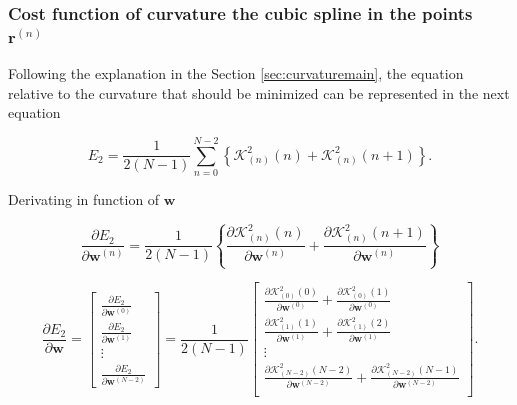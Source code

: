 \subsubsection{Cost function of curvature the cubic spline in the points $\mathbf{r}^{(n)}$}

Following the explanation in the Section \ref{sec:curvaturemain},
the equation relative to the curvature that should be minimized can be represented in the next equation




\begin{equation}
E_{2}
=
\frac{1}{2(N-1)}
\sum\limits_{n=0}^{N-2}
\left\{
\mathcal{K}_{(n)}^{2}(n)
+
\mathcal{K}_{(n)}^{2}(n+1)
\right\}.
\end{equation}

Derivating in function of $\mathbf{w}$

\begin{equation}
\frac{\partial E_{2}}{\partial \mathbf{w}^{(n)}}
=
\frac{1}{2(N-1)}
\left\{
\frac{
\partial 
\mathcal{K}_{(n)}^{2}(n)
}{\partial \mathbf{w}^{(n)}}
+
\frac{
\partial 
\mathcal{K}_{(n)}^{2}(n+1)
}{\partial \mathbf{w}^{(n)}}
\right\}
\end{equation}

\begin{equation}\label{eq:DE2}
\frac{\partial E_{2}}{\partial \mathbf{w}}
=
\begin{bmatrix}
\frac{\partial E_{2}}{\partial \mathbf{w}^{(0)}}\\[4pt]
\frac{\partial E_{2}}{\partial \mathbf{w}^{(1)}}\\[4pt]
\vdots\\[4pt]
\frac{\partial E_{2}}{\partial \mathbf{w}^{(N-2)}}
\end{bmatrix}
=
\frac{1}{2(N-1)}
\begin{bmatrix}
%
\frac{
\partial 
\mathcal{K}_{(0)}^{2}(0)
}{\partial \mathbf{w}^{(0)}}
+
\frac{
\partial 
\mathcal{K}_{(0)}^{2}(1)
}{\partial \mathbf{w}^{(0)}}\\[4pt]
%
\frac{
\partial 
\mathcal{K}_{(1)}^{2}(1)
}{\partial \mathbf{w}^{(1)}}
+
\frac{
\partial 
\mathcal{K}_{(1)}^{2}(2)
}{\partial \mathbf{w}^{(1)}}\\[4pt]
%
\vdots\\[4pt]
\frac{
\partial 
\mathcal{K}_{(N-2)}^{2}(N-2)
}{\partial \mathbf{w}^{(N-2)}}
+
\frac{
\partial 
\mathcal{K}_{(N-2)}^{2}(N-1)
}{\partial \mathbf{w}^{(N-2)}}\\
%
\end{bmatrix}
.
\end{equation}

